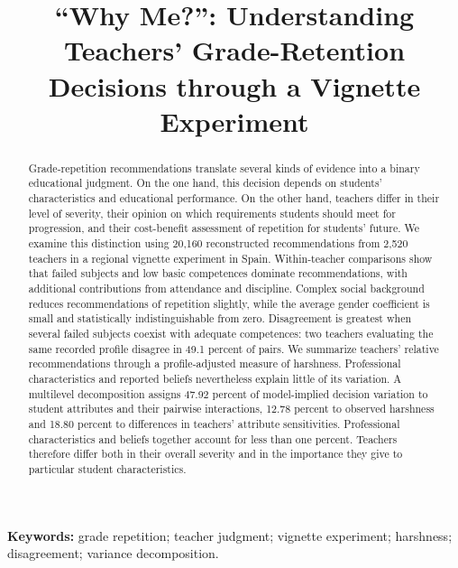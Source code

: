 
\title{“Why Me?”: Understanding Teachers’ Grade-Retention Decisions through a Vignette Experiment}
\author{\authors}

\maketitle
\color{reused}
\begin{abstract}
Grade-repetition recommendations translate several kinds of evidence into a binary educational judgment. On the one hand, this decision depends on students' characteristics and educational performance. On the other hand, teachers differ in their level of severity, their opinion on which requirements students should meet for progression, and their cost-benefit assessment of repetition for students' future. We examine this distinction using 20,160 reconstructed recommendations from 2,520 teachers in a regional vignette experiment in Spain. Within-teacher comparisons show that failed subjects and low basic competences dominate recommendations, with additional contributions from attendance and discipline. Complex social background reduces recommendations of repetition slightly, while the average gender coefficient is small and statistically indistinguishable from zero. Disagreement is greatest when several failed subjects coexist with adequate competences: two teachers evaluating the same recorded profile disagree in 49.1 percent of pairs. We summarize teachers' relative recommendations through a profile-adjusted measure of harshness. Professional characteristics and reported beliefs nevertheless explain little of its variation. A multilevel decomposition assigns 47.92 percent of model-implied decision variation to student attributes and their pairwise interactions, 12.78 percent to observed harshness and 18.80 percent to differences in teachers' attribute sensitivities. Professional characteristics and beliefs together account for less than one percent. Teachers therefore differ both in their overall severity and in the importance they give to particular student characteristics.
\end{abstract}
\noindent\textbf{Keywords:} grade repetition; teacher judgment; vignette experiment; harshness; disagreement; variance decomposition.

